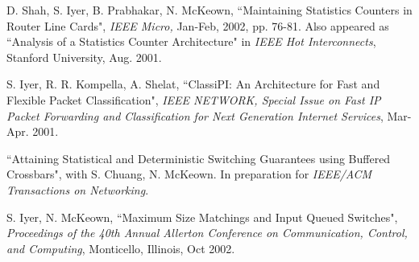 \documentclass[a4paper, 10pt]{article}
\begin{document}
\begin{footnotesize}
\begin{thebibliography}{}
D. Shah, S. Iyer, B. Prabhakar, N. McKeown,
``Maintaining Statistics Counters in Router Line Cards", {\it IEEE Micro,} Jan-Feb, 2002, pp.
76-81. Also appeared as ``Analysis of a Statistics Counter Architecture"  in {\it IEEE Hot Interconnects}, Stanford University, Aug. 2001.

S. Iyer, R. R. Kompella, A. Shelat, ``ClassiPI: An Architecture for Fast and Flexible Packet Classification", {\it IEEE NETWORK, Special Issue on Fast IP Packet Forwarding and Classification
for Next Generation Internet Services}, Mar-Apr. 2001.

``Attaining Statistical and Deterministic Switching Guarantees using Buffered
Crossbars", with S. Chuang, N. McKeown. In preparation for {\it IEEE/ACM Transactions
on Networking}.

S. Iyer, N. McKeown, ``Maximum Size Matchings and Input Queued Switches",
{\it Proceedings of the 40th Annual Allerton Conference on Communication, Control, and
Computing}, Monticello, Illinois, Oct 2002.



\end{thebibliography}
\end{footnotesize}
\end{document}

